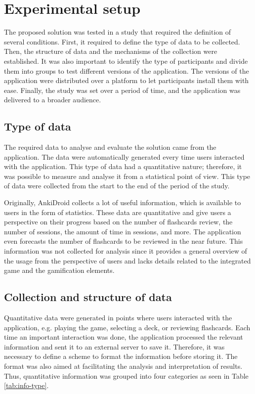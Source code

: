 
\chapter{Experimental setup} %

\label{expe} %


The proposed solution was tested in a study that required the definition of several conditions. First, it required to define the type of data to be collected. Then, the structure of data and the mechanisms of the collection were established. It was also important to identify the type of participants and divide them into groups to test different versions of the application. The versions of the application were distributed over a platform to let participants install them with ease. Finally, the study was set over a period of time, and the application was delivered to a broader audience.

\section{Type of data}
The required data to analyse and evaluate the solution came from the application. The data were automatically generated every time users interacted with the application. This type of data had a quantitative nature; therefore, it was possible to measure and analyse it from a statistical point of view. This type of data were collected from the start to the end of the period of the study.

Originally, AnkiDroid collects a lot of useful information, which is available to users in the form of statistics. These data are quantitative and give users a perspective on their progress based on the number of flashcards review, the number of sessions, the amount of time in sessions, and more. The application even forecasts the number of flashcards to be reviewed in the near future. This information was not collected for analysis since it provides a general overview of the usage from the perspective of users and lacks details related to the integrated game and the gamification elements.

\section{Collection and structure of data}
Quantitative data were generated in points where users interacted with the application, e.g. playing the game, selecting a deck, or reviewing flashcards. Each time an important interaction was done, the application processed the relevant information and sent it to an external server to save it. Therefore, it was necessary to define a scheme to format the information before storing it. The format was also aimed at facilitating the analysis and interpretation of results. Thus, quantitative information was grouped into four categories as seen in Table \ref{tab:info-type}.

